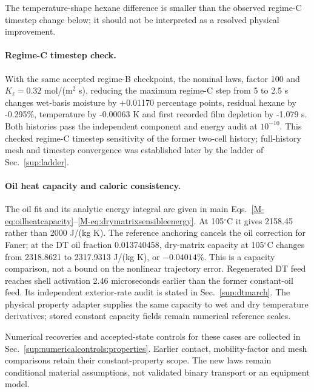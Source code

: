 The temperature-shape hexane difference is smaller than the observed regime-C timestep change below; it should not be interpreted as a resolved physical improvement.

\paragraph{Regime-C timestep check.}
With the same accepted regime-B checkpoint, the nominal laws, factor 100 and $K_\ell=0.32$ mol/(m$^2$ s), reducing the maximum regime-C step from 5 to 2.5 s changes wet-basis moisture by +0.01170 percentage points, residual hexane by -0.295\%, temperature by -0.00063 K and first recorded film depletion by -1.079 s. Both histories pass the independent component and energy audit at $10^{-10}$. This checked regime-C timestep sensitivity of the former two-cell history; full-history mesh and timestep convergence was established later by the ladder of Sec.~\ref{sup:ladder}.

\paragraph{Oil heat capacity and caloric consistency.}
The oil fit and its analytic energy integral are given in main
Eqs.~\ref*{M-eq:oilheatcapacity}--\ref*{M-eq:drymatrixsensibleenergy}.
At 105$^\circ$C it gives 2158.45 rather than 2000 J/(kg K).
The reference anchoring cancels the oil correction for Faner; at the DT oil
fraction 0.013740458, dry-matrix capacity at 105$^\circ$C changes from
2318.8621 to 2317.9313 J/(kg K), or $-0.04014\%$. This is a capacity
comparison, not a bound on the nonlinear trajectory error. Regenerated
DT feed reaches shell activation 2.46 microseconds earlier than the
former constant-oil feed. Its independent exterior-rate audit is stated
in Sec.~\ref{sup:dtmarch}. The physical property adapter supplies the same capacity to wet and dry
temperature derivatives; stored constant capacity fields remain numerical
reference scales.

Numerical recoveries and accepted-state controls for these cases are
collected in Sec.~\ref{sup:numericalcontrols:properties}. Earlier contact,
mobility-factor and mesh comparisons retain their constant-property scope.
The new laws remain conditional material assumptions, not validated binary
transport or an equipment model.
